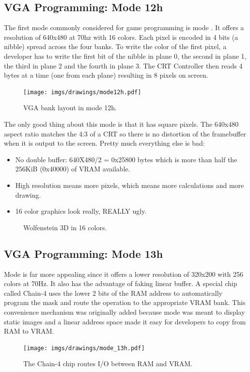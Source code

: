 \documentclass[book.tex]{subfiles}
\begin{document}
 \subsection{VGA Programming: Mode 12h}
 The first mode commonly considered for game programming is mode . It offers a resolution of 640x480 at 70hz with 16 colors. Each pixel is encoded in 4 bits (a nibble) spread across the four banks. To write the color of the first pixel, a developer has to write the first bit of the nibble in plane 0, the second in plane 1, the third in plane 2 and the fourth in plane 3. The CRT Controller then reads 4 bytes at a time (one from each plane) resulting in 8 pixels on screen.\\
\par
\begin{figure}[H]
\centering
 \texttt{[image: imgs/drawings/mode12h.pdf]}
\caption{VGA bank layout in mode 12h.}
\end{figure}
\par

The only good thing about this mode is that it has square pixels. The 640x480 aspect ratio matches the 4:3 of a CRT so there is no distortion of the framebuffer when it is output to the screen. Pretty much everything else is bad:\\
\begin{itemize}
\item No double buffer: 640X480/2 = 0x25800 bytes which is more than half the 256KiB (0x40000) of VRAM available.
\item High resolution means more pixels, which means more calculations and more drawing.
\item 16 color graphics look really, REALLY ugly.
\end{itemize}

 \begin{figure}[H]
\centering
 \caption{Wolfenstein 3D in 16 colors.}
\end{figure}





 
  \subsection{VGA Programming: Mode 13h}
  Mode  is far more appealing since it offers a lower resolution of 320x200 with 256 colors at 70Hz. It also has the advantage of faking linear buffer. A special chip called Chain-4 uses the lower 2 bits of the RAM address to automatically program the mask and route the operation to the appropriate VRAM bank. This convenience mechanism was originally added because mode  was meant to display static images and a linear address space made it easy for developers to copy from RAM to VRAM.\\
  \par
 \begin{figure}[H]
\centering
      \texttt{[image: imgs/drawings/mode\_13h.pdf]}
      \caption{The Chain-4 chip routes I/O between RAM and VRAM.}
\end{figure}
\par
\end{document}
